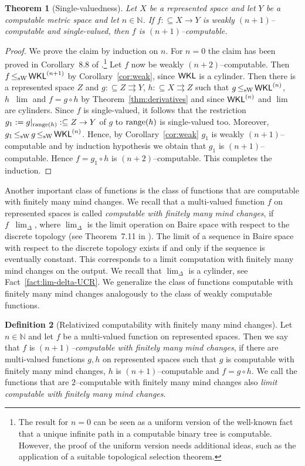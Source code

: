 \documentclass[a4paper]{amsart}
\def\IN{{\mathbb{N}}}
\def\In{\subseteq}
\def\mto{\rightrightarrows}
\def\range{{\rm range}}
\def\WKL{\text{\rm\sffamily WKL}}
\def\leqW{\mathop{\leq_{\mathrm{W}}}}
\def\leqSW{\mathop{\leq_{\mathrm{sW}}}}
\newtheorem{theorem}{Theorem}[section]
\theoremstyle{definition}
\newtheorem{definition}[theorem]{Definition}
\begin{document}
\begin{theorem}[Single-valuedness]
\label{thm:single-valuedness}
Let $X$ be a represented space and let $Y$ be a computable metric space and let $n\in\IN$.
If $f:\In X\to Y$ is weakly $(n+1)$--computable and single-valued, then $f$ is $(n+1)$--computable.
\end{theorem}
\begin{proof}
We prove the claim by induction on $n$. For $n=0$ the claim has been proved in Corollary~8.8 of \cite{BG11}.\footnote{The
result for $n=0$ can be seen as a uniform version of the well-known fact that a unique infinite path in a computable binary tree is computable.
However, the proof of the uniform version needs additional ideas, such as the application
of a suitable topological selection theorem.}
Let $f$ now be weakly $(n+2)$--computable. 
Then $f\leqSW\WKL^{(n+1)}$ by Corollary~\ref{cor:weak},  since $\WKL$ is a cylinder.
Then there is a represented space $Z$
and $g:\In Z\mto Y$, $h:\In X\mto Z$ such that $g\leqSW\WKL^{(n)}$, $h\leqSW\lim$ and $f=g\circ h$
by Theorem~\ref{thm:derivatives} and since $\WKL^{(n)}$ and $\lim$ are cylinders. 
Since $f$ is single-valued, it follows that the restriction $g_1:=g|_{\range(h)}:\In Z\to Y$ of $g$ to $\range(h)$ is single-valued
too. Moreover, $g_1\leqSW g\leqSW\WKL^{(n)}$. 
Hence, by Corollary~\ref{cor:weak} $g_1$ is weakly $(n+1)$--computable and by 
induction hypothesis we obtain that $g_1$ is $(n+1)$--computable.
Hence $f=g_1\circ h$ is $(n+2)$--computable. This completes the induction.
\end{proof}

Another important class of functions is the class of functions that are computable
with finitely many mind changes. 
We recall that a multi-valued function $f$ on represented spaces is called {\em computable with finitely many mind changes},
if $f\leqW\lim_\Delta$, where $\lim_\Delta$ is the limit operation on Baire space with respect to the discrete topology
(see Theorem~7.11 in \cite{BBP}). 
The limit of a sequence in Baire space with respect to the discrete topology exists if and only if the sequence
is eventually constant. This corresponds to a limit computation with finitely many mind changes on the output.
We recall that $\lim_\Delta$ is a cylinder, see Fact~\ref{fact:lim-delta-UCR}.
We generalize the class of functions computable with finitely many mind changes analogously to the class of weakly computable functions.

\begin{definition}[Relativized computability with finitely many mind changes]
Let $n\in\IN$ and let $f$ be a multi-valued function on represented spaces. Then we 
say that $f$ is {\em $(n+1)$--computable with finitely many mind changes}, if there are multi-valued functions $g,h$
on represented spaces such that $g$ is computable with finitely many mind changes, $h$ is $(n+1)$--computable and $f=g\circ h$.
We call the functions that are $2$--computable with finitely many mind changes also {\em limit computable with finitely many mind changes}.
\end{definition}
\end{document}
